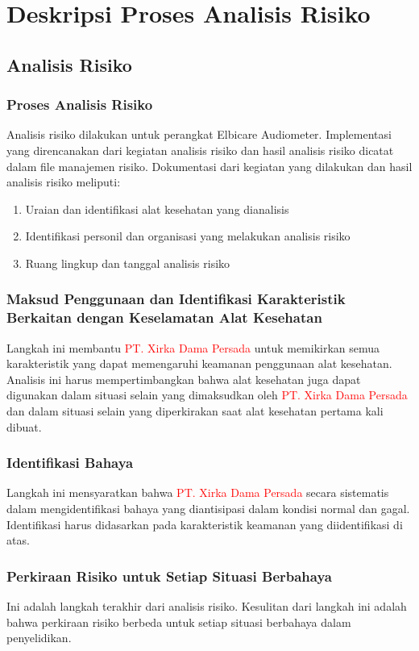 \documentclass[11pt,a4paper,twoside,draft,onecolumn]{book}
\begin{document}
	\chapter{Deskripsi Proses Analisis Risiko}
		\section{Analisis Risiko}
			\subsection{Proses Analisis Risiko}
			Analisis risiko dilakukan untuk perangkat Elbicare Audiometer. Implementasi yang direncanakan dari kegiatan analisis risiko dan hasil analisis risiko dicatat dalam file manajemen risiko. Dokumentasi dari kegiatan yang dilakukan dan hasil analisis risiko meliputi:
			\begin{enumerate}
				\item Uraian dan identifikasi alat kesehatan yang dianalisis
				\item Identifikasi personil dan organisasi yang melakukan analisis risiko
				\item Ruang lingkup dan tanggal analisis risiko
			\end{enumerate}
		
			\subsection{Maksud Penggunaan dan Identifikasi Karakteristik Berkaitan dengan Keselamatan Alat Kesehatan}
			Langkah ini membantu \textcolor{red}{PT. Xirka Dama Persada} untuk memikirkan semua karakteristik yang dapat memengaruhi keamanan penggunaan alat kesehatan. Analisis ini harus mempertimbangkan bahwa alat kesehatan juga dapat digunakan dalam situasi selain yang dimaksudkan oleh \textcolor{red}{PT. Xirka Dama Persada} dan dalam situasi selain yang diperkirakan saat alat kesehatan pertama kali dibuat.
			
			\subsection{Identifikasi Bahaya}
			Langkah ini mensyaratkan bahwa \textcolor{red}{PT. Xirka Dama Persada} secara sistematis dalam mengidentifikasi bahaya yang diantisipasi dalam kondisi normal dan gagal. Identifikasi harus didasarkan pada karakteristik keamanan yang diidentifikasi di atas.
			
			\subsection{Perkiraan Risiko untuk Setiap Situasi Berbahaya}
			Ini adalah langkah terakhir dari analisis risiko. Kesulitan dari langkah ini adalah bahwa perkiraan risiko berbeda untuk setiap situasi berbahaya dalam penyelidikan.
			
\end{document}
